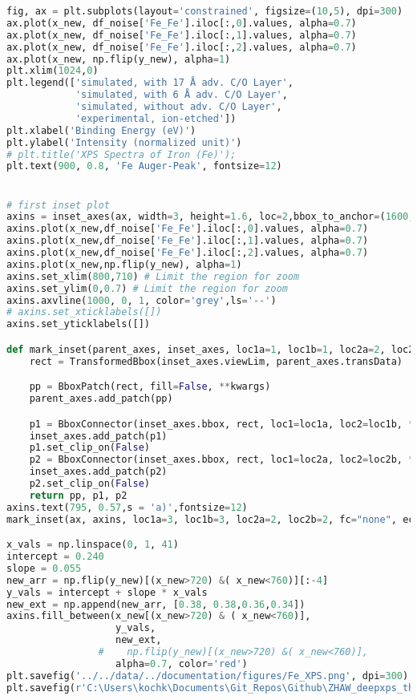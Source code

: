 \begin{lstlisting}[language=Python]
fig, ax = plt.subplots(layout='constrained', figsize=(10,5), dpi=300)
ax.plot(x_new, df_noise['Fe_Fe'].iloc[:,0].values, alpha=0.7)
ax.plot(x_new, df_noise['Fe_Fe'].iloc[:,1].values, alpha=0.7)
ax.plot(x_new, df_noise['Fe_Fe'].iloc[:,2].values, alpha=0.7)
ax.plot(x_new, np.flip(y_new), alpha=1)
plt.xlim(1024,0)
plt.legend(['simulated, with 17 Å adv. C/O Layer',
            'simulated, with 6 Å adv. C/O Layer',
            'simulated, without adv. C/O Layer',
            'experimental, ion-etched'])
plt.xlabel('Binding Energy (eV)')
plt.ylabel('Intensity (normalized unit)')
# plt.title('XPS Spectra of Iron (Fe)');
plt.text(900, 0.8, 'Fe Auger-Peak', fontsize=12)


# first inset plot
axins = inset_axes(ax, width=3, height=1.6, loc=2,bbox_to_anchor=(1600,1200)) # zoom = 6
axins.plot(x_new,df_noise['Fe_Fe'].iloc[:,0].values, alpha=0.7)
axins.plot(x_new,df_noise['Fe_Fe'].iloc[:,1].values, alpha=0.7)
axins.plot(x_new,df_noise['Fe_Fe'].iloc[:,2].values, alpha=0.7)
axins.plot(x_new,np.flip(y_new), alpha=1)
axins.set_xlim(800,710) # Limit the region for zoom
axins.set_ylim(0,0.7) # Limit the region for zoom
axins.axvline(1000, 0, 1, color='grey',ls='--')
# axins.set_xticklabels([])
axins.set_yticklabels([])

def mark_inset(parent_axes, inset_axes, loc1a=1, loc1b=1, loc2a=2, loc2b=2, **kwargs):
    rect = TransformedBbox(inset_axes.viewLim, parent_axes.transData)

    pp = BboxPatch(rect, fill=False, **kwargs)
    parent_axes.add_patch(pp)

    p1 = BboxConnector(inset_axes.bbox, rect, loc1=loc1a, loc2=loc1b, **kwargs)
    inset_axes.add_patch(p1)
    p1.set_clip_on(False)
    p2 = BboxConnector(inset_axes.bbox, rect, loc1=loc2a, loc2=loc2b, **kwargs)
    inset_axes.add_patch(p2)
    p2.set_clip_on(False)
    return pp, p1, p2
axins.text(795, 0.57,s = 'a)',fontsize=12)
mark_inset(ax, axins, loc1a=3, loc1b=3, loc2a=2, loc2b=2, fc="none", ec="black", alpha=0.6);

x_vals = np.linspace(0, 1, 41)
intercept = 0.240
slope = 0.055
new_arr = np.flip(y_new)[(x_new>720) &( x_new<760)][:-4]
y_vals = intercept + slope * x_vals
new_ext = np.append(new_arr, [0.38, 0.38,0.36,0.34])
axins.fill_between(x_new[(x_new>720) & ( x_new<760)],
                   y_vals, 
                   new_ext,
                #    np.flip(y_new)[(x_new>720) &( x_new<760)], 
                   alpha=0.7, color='red')
plt.savefig('../../data/../documentation/figures/Fe_XPS.png', dpi=300)
plt.savefig(r'C:\Users\kochk\Documents\Git_Repos\Github\ZHAW_deepxps_thesis\Figures\Fe_XPS.png', dpi=300)
\end{lstlisting}


